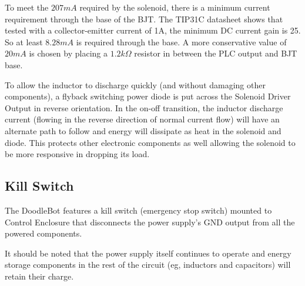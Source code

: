 		To meet the $207mA$ required by the solenoid, there is a minimum current requirement through the base of the BJT. The TIP31C datasheet shows that tested with a collector-emitter current of 1A, the minimum DC current gain is 25. So at least $8.28mA$ is required through the base. A more conservative value of $20mA$ is chosen by placing a $1.2k\Omega$ resistor in between the PLC output and BJT base.
		
		To allow the inductor to discharge quickly (and without damaging other components), a flyback switching power diode is put across the Solenoid Driver Output in reverse orientation. In the on-off transition, the inductor discharge current (flowing in the reverse direction of normal current flow) will have an alternate path to follow and energy will dissipate as heat in the solenoid and diode. This protects other electronic components as well allowing the solenoid to be more responsive in dropping its load.
		
	\subsection{Kill Switch}
		The DoodleBot features a kill switch (emergency stop switch) mounted to Control Enclosure that disconnects the power supply's GND output from all the powered components. 
		
		It should be noted that the power supply itself continues to operate and energy storage components in the rest of the circuit (eg, inductors and capacitors) will retain their charge.



